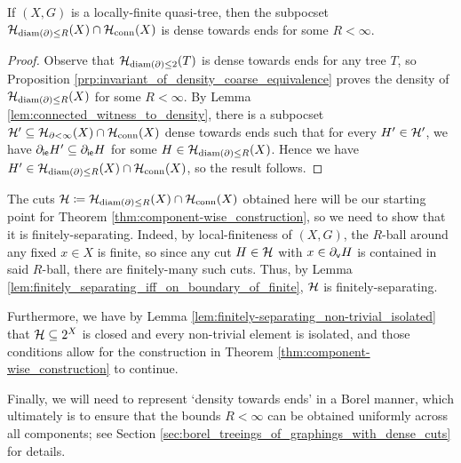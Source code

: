 \documentclass[reqno]{amsart}
\begin{document}
    \begin{corollary}\label{cor:density_of_bounded_diameter_boundary_cuts_quasi_tree}
        If $(X,G)$ is a locally-finite quasi-tree, then the subpocset $\mathcal{H}_{\operatorname{diam}(\partial)\leq R}(X)\cap\mathcal{H}_\mathrm{conn}(X)$ is dense towards ends for some $R<\infty$.
    \end{corollary}
    \begin{proof}
        Observe that $\mathcal{H}_{\operatorname{diam}(\partial)\leq2}(T)$ is dense towards ends for any tree $T$, so Proposition \ref{prp:invariant_of_density_coarse_equivalence} proves the density of $\mathcal{H}_{\operatorname{diam}(\partial)\leq R}(X)$ for some $R<\infty$. By Lemma \ref{lem:connected_witness_to_density}, there is a subpocset $\mathcal{H}'\subseteq\mathcal{H}_{\partial<\infty}(X)\cap\mathcal{H}_\mathrm{conn}(X)$ dense towards ends such that for every $H'\in\mathcal{H}'$, we have $\partial_\mathsf{ie}H'\subseteq\partial_\mathsf{ie}H$ for some $H\in\mathcal{H}_{\operatorname{diam}(\partial)\leq R}(X)$. Hence we have $H'\in\mathcal{H}_{\operatorname{diam}(\partial)\leq R}(X)\cap\mathcal{H}_\mathrm{conn}(X)$, so the result follows.
    \end{proof}

    The cuts $\mathcal{H}\coloneqq\mathcal{H}_{\operatorname{diam}(\partial)\leq R}(X)\cap\mathcal{H}_\mathrm{conn}(X)$ obtained here will be our starting point for Theorem \ref{thm:component-wise_construction}, so we need to show that it is finitely-separating. Indeed, by local-finiteness of $(X,G)$, the $R$-ball around any fixed $x\in X$ is finite, so since any cut $H\in\mathcal{H}$ with $x\in\partial_\mathsf{v}H$ is contained in said $R$-ball, there are finitely-many such cuts. Thus, by Lemma \ref{lem:finitely_separating_iff_on_boundary_of_finite}, $\mathcal{H}$ is finitely-separating.

    Furthermore, we have by Lemma \ref{lem:finitely-separating_non-trivial_isolated} that $\mathcal{H}\subseteq2^X$ is closed and every non-trivial element is isolated, and those conditions allow for the construction in Theorem \ref{thm:component-wise_construction} to continue.

    Finally, we will need to represent `density towards ends' in a Borel manner, which ultimately is to ensure that the bounds $R<\infty$ can be obtained uniformly across all components; see Section \ref{sec:borel_treeings_of_graphings_with_dense_cuts} for details.
\end{document}
